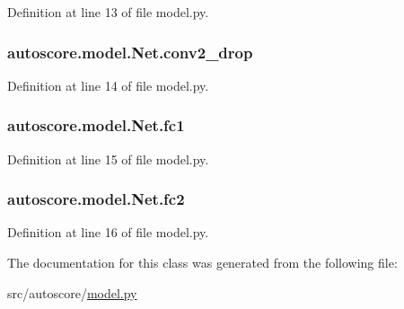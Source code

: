 Definition at line 13 of file model.\+py.

\subsubsection[{\texorpdfstring{conv2\+\_\+drop}{conv2_drop}}]{\setlength{\rightskip}{0pt plus 5cm}autoscore.\+model.\+Net.\+conv2\+\_\+drop}\hypertarget{classautoscore_1_1model_1_1Net_aea9cd230e23281abf4d8d23e768b7918}{}\label{classautoscore_1_1model_1_1Net_aea9cd230e23281abf4d8d23e768b7918}


Definition at line 14 of file model.\+py.

\subsubsection[{\texorpdfstring{fc1}{fc1}}]{\setlength{\rightskip}{0pt plus 5cm}autoscore.\+model.\+Net.\+fc1}\hypertarget{classautoscore_1_1model_1_1Net_ace16e109006254bbd976660c4df63ac8}{}\label{classautoscore_1_1model_1_1Net_ace16e109006254bbd976660c4df63ac8}


Definition at line 15 of file model.\+py.

\subsubsection[{\texorpdfstring{fc2}{fc2}}]{\setlength{\rightskip}{0pt plus 5cm}autoscore.\+model.\+Net.\+fc2}\hypertarget{classautoscore_1_1model_1_1Net_ac2913be42e89e170ae4829f901169e46}{}\label{classautoscore_1_1model_1_1Net_ac2913be42e89e170ae4829f901169e46}


Definition at line 16 of file model.\+py.



The documentation for this class was generated from the following file\+:\begin{DoxyCompactItemize}
\item 
src/autoscore/\hyperlink{model_8py}{model.\+py}\end{DoxyCompactItemize}
